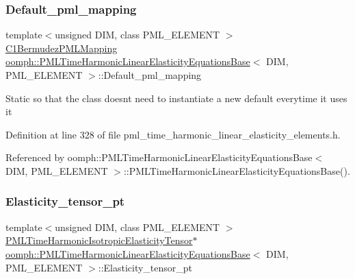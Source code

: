 \subsubsection{\texorpdfstring{Default\+\_\+pml\+\_\+mapping}{Default\_pml\_mapping}}
{\footnotesize\ttfamily template$<$unsigned D\+IM, class P\+M\+L\+\_\+\+E\+L\+E\+M\+E\+NT $>$ \\
\hyperlink{classoomph_1_1C1BermudezPMLMapping}{C1\+Bermudez\+P\+M\+L\+Mapping} \hyperlink{classoomph_1_1PMLTimeHarmonicLinearElasticityEquationsBase}{oomph\+::\+P\+M\+L\+Time\+Harmonic\+Linear\+Elasticity\+Equations\+Base}$<$ D\+IM, P\+M\+L\+\_\+\+E\+L\+E\+M\+E\+NT $>$\+::Default\+\_\+pml\+\_\+mapping\hspace{0.3cm}{\ttfamily [static]}}

Static so that the class doesn\textquotesingle{}t need to instantiate a new default everytime it uses it 

Definition at line 328 of file pml\+\_\+time\+\_\+harmonic\+\_\+linear\+\_\+elasticity\+\_\+elements.\+h.



Referenced by oomph\+::\+P\+M\+L\+Time\+Harmonic\+Linear\+Elasticity\+Equations\+Base$<$ D\+I\+M, P\+M\+L\+\_\+\+E\+L\+E\+M\+E\+N\+T $>$\+::\+P\+M\+L\+Time\+Harmonic\+Linear\+Elasticity\+Equations\+Base().

\mbox{\label{classoomph_1_1PMLTimeHarmonicLinearElasticityEquationsBase_a53e10e041739091061f1305880391ccd}} 
\subsubsection{\texorpdfstring{Elasticity\+\_\+tensor\+\_\+pt}{Elasticity\_tensor\_pt}}
{\footnotesize\ttfamily template$<$unsigned D\+IM, class P\+M\+L\+\_\+\+E\+L\+E\+M\+E\+NT $>$ \\
\hyperlink{classoomph_1_1PMLTimeHarmonicIsotropicElasticityTensor}{P\+M\+L\+Time\+Harmonic\+Isotropic\+Elasticity\+Tensor}$\ast$ \hyperlink{classoomph_1_1PMLTimeHarmonicLinearElasticityEquationsBase}{oomph\+::\+P\+M\+L\+Time\+Harmonic\+Linear\+Elasticity\+Equations\+Base}$<$ D\+IM, P\+M\+L\+\_\+\+E\+L\+E\+M\+E\+NT $>$\+::Elasticity\+\_\+tensor\+\_\+pt\hspace{0.3cm}{\ttfamily [protected]}}



